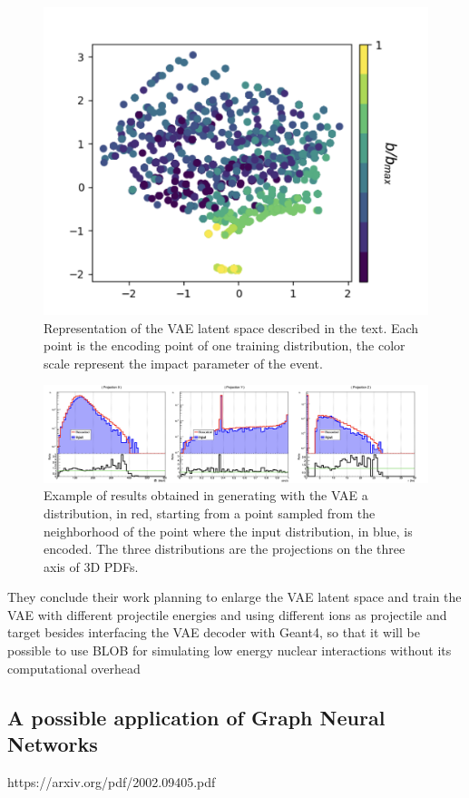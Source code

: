 \begin{figure}[!bht]
\centering
\includegraphics [width=.7\textwidth]{images/latent3}    
\caption{Representation of the VAE latent space described in the text. Each point is the encoding point of one training distribution, the color scale represent the impact parameter of the event.}
\label{fig:latent}
\end{figure}

\begin{figure}[!bht]
\centering
\includegraphics [width=\textwidth]{images/generated}
\caption{Example of results obtained in generating with the VAE a distribution, in red, starting from a point sampled from the neighborhood of the point where the input distribution, in blue, is encoded. The three distributions are the projections on the three axis of 3D PDFs.}
\label{fig:out}
\end{figure}

They conclude their work planning to enlarge the VAE latent space and train the VAE with different projectile energies and using different ions as projectile and target besides interfacing the VAE decoder with Geant4,
 so that it will be possible to use BLOB
 for simulating low energy nuclear interactions without its computational overhead


\subsection{A possible application of Graph Neural Networks}
https://arxiv.org/pdf/2002.09405.pdf

